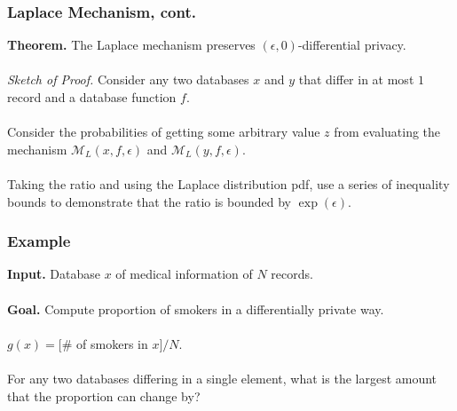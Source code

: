 \documentclass[aspectratio=169]{beamer}
\newcommand{\emm}{\mathcal{M}}
\begin{document}
\begin{frame}
\frametitle{Laplace Mechanism, cont.}

\textbf{Theorem.} The Laplace mechanism preserves $(\epsilon, 0)$-differential privacy.\\~\\

\emph{Sketch of Proof.} Consider any two databases $x$ and $y$ that differ in at most $1$ record and a database function $f$. \\~\\

Consider the probabilities of getting some arbitrary value $z$ from evaluating the mechanism $\emm_L(x, f, \epsilon)$ and $\emm_L(y, f, \epsilon)$.\\~\\

Taking the ratio and using the Laplace distribution pdf, use a series of inequality bounds to demonstrate that the ratio is bounded by $\exp(\epsilon)$.

\end{frame}

\begin{frame}
\frametitle{Example}

\textbf{Input.} Database $x$ of medical information of $N$ records.\\~\\

\textbf{Goal.} Compute proportion of smokers in a differentially private way.\\~\\

$g(x) = [\#$ of smokers in $x]/N$.\\~\\

For any two databases differing in a single element, what is the largest amount that the proportion can change by?
\end{frame}
\end{document}
